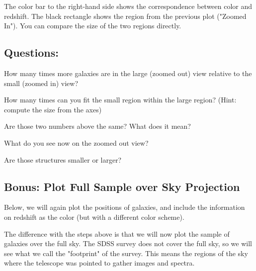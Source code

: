 \documentclass[11pt]{article}
\begin{document}
    The color bar to the right-hand side shows the correspondence between
color and redshift. The black rectangle shows the region from the
previous plot ("Zoomed In"). You can compare the size of the two regions
directly.

\subsection{Questions:}\label{questions}

How many times more galaxies are in the large (zoomed out) view relative
to the small (zoomed in) view?

How many times can you fit the small region within the large region?
(Hint: compute the size from the axes)

Are those two numbers above the same? What does it mean?

What do you see now on the zoomed out view?

Are those structures smaller or larger?

    \subsection{Bonus: Plot Full Sample over Sky
Projection}\label{bonus-plot-full-sample-over-sky-projection}

Below, we will again plot the positions of galaxies, and include the
information on redshift as the color (but with a different color
scheme).

The difference with the steps above is that we will now plot the sample
of galaxies over the full sky. The SDSS survey does not cover the full
sky, so we will see what we call the "footprint" of the survey. This
means the regions of the sky where the telescope was pointed to gather
images and spectra.
\end{document}
